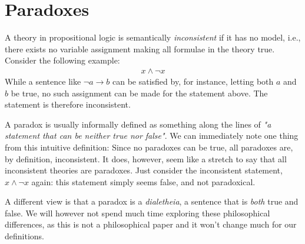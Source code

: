 \section{Paradoxes}
\label{sec:Paradoxes}
A theory in propositional logic is semantically \textit{inconsistent} if it has no model, i.e., there exists no variable assignment making all formulae in the theory true.
Consider the following example:
\begin{align}
  x \wedge \neg x
\end{align}
While a sentence like $\neg a \rightarrow b$ can be satisfied by, for instance, letting both $a$ and $b$ be true, no such assignment can be made for the statement above.
The statement is therefore inconsistent.

A paradox is usually informally defined as something along the lines of \textit{"a statement that can be neither true nor false"}.
We can immediately note one thing from this intuitive definition:
Since no paradoxes can be true, all paradoxes are, by definition, inconsistent.
It does, however, seem like a stretch to say that all inconsistent theories are paradoxes.  Just consider the inconsistent statement, $x \wedge \neg x$ again: this statement simply seems false, and not paradoxical.

A different view is that a paradox is a \textit{dialetheia}, a sentence that is \textit{both} true and false\cite{sep-dialetheism}. We will however not spend much time exploring these philosophical differences, as this is not a philosophical paper and it won't change much for our definitions.

